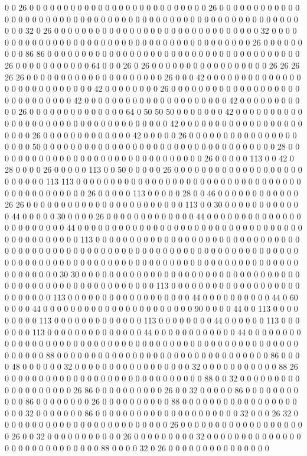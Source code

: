 0 0 26 0 0 0 0 0 0 0 0 0 0 0 0 0 0 0 0 0 0 0 0 0 0 0 0 0 0 26 0 0 0 0 0 0 0 0 0 0 0 0 0 0 0 0 0 0 0 0 0 0 0 0 0 0 0 0 0 0 0 0 0 0 0 0 0 0 0 0 0 0 0 0 0 0 0 0 0 0 0 0 0 0 0 0 0 0 32 0 26 0 0 0 0 0 0 0 0 0 0 0 0 0 0 0 0 0 0 0 0 0 0 0 0 0 0 0 0 0 0 32 0 0 0 0 0 0 0 0 0 0 0 0 0 0 0 0 0 0 0 0 0 0 0 0 0 0 0 0 0 0 0 0 0 0 0 0 0 0 0 0 26 0 0 0 0 0 0 0 0 0 86 86 0 0 0 0 0 0 0 0 0 0 0 0 0 0 0 0 0 0 0 0 0 0 0 0 0 0 0 0 0 0 0 0 0 0 0 0 0 26 0 0 0 0 0 0 0 0 0 0 0 64 0 0 0 26 0 26 0 0 0 0 0 0 0 0 0 0 0 0 0 0 0 0 0 26 26 26 26 26 0 0 0 0 0 0 0 0 0 0 0 0 0 0 0 0 0 0 0 0 26 0 0 0 42 0 0 0 0 0 0 0 0 0 0 0 0 0 0 0 0 0 0 0 0 0 0 0 0 0 0 0 42 0 0 0 0 0 0 0 0 26 0 0 0 0 0 0 0 0 0 0 0 0 0 0 0 0 0 0 0 0 0 0 0 0 0 0 0 0 0 42 0 0 0 0 0 0 0 0 0 0 0 0 0 0 0 0 0 0 0 0 0 42 0 0 0 0 0 0 0 0 0 0 0 26 0 0 0 0 0 0 0 0 0 0 0 0 0 0 64 0 50 50 50 0 0 0 0 0 0 0 42 0 0 0 0 0 0 0 0 0 0 0 0 0 0 0 0 0 0 0 0 0 0 0 0 0 0 0 0 0 0 0 0 0 0 42 0 0 0 0 0 0 0 0 0 0 0 0 0 0 0 0 0 0 0 0 0 0 26 0 0 0 0 0 0 0 0 0 0 0 0 0 42 0 0 0 0 0 26 0 0 0 0 0 0 0 0 0 0 0 0 0 0 0 0 0 0 0 0 50 0 0 0 0 0 0 0 0 0 0 0 0 0 0 0 0 0 0 0 0 0 0 0 0 0 0 0 0 0 0 0 0 0 0 28 0 0 0 0 0 0 0 0 0 0 0 0 0 0 0 0 0 0 0 0 0 0 0 0 0 0 0 0 0 0 0 26 0 0 0 0 0 113 0 0 42 0 28 0 0 0 0 26 0 0 0 0 0 113 0 0 50 0 0 0 0 0 26 0 0 0 0 0 0 0 0 0 0 0 0 0 0 0 0 0 0 0 0 0 0 0 0 0 113 113 0 0 0 0 0 0 0 0 0 0 0 0 0 0 0 0 0 0 0 0 0 0 0 0 0 0 0 0 0 0 0 0 0 0 0 0 0 0 0 0 0 0 0 0 0 26 0 0 0 0 0 113 0 0 0 0 0 28 0 0 46 0 0 0 0 0 0 0 0 0 0 0 0 26 26 0 0 0 0 0 0 0 0 0 0 0 0 0 0 0 0 0 0 0 0 0 0 0 113 0 0 30 0 0 0 0 0 0 0 0 0 0 0 0 44 0 0 0 0 0 30 0 0 0 0 26 0 0 0 0 0 0 0 0 0 0 0 0 0 44 0 0 0 0 0 0 0 0 0 0 0 0 0 0 0 0 0 0 0 0 0 0 0 44 0 0 0 0 0 0 0 0 0 0 0 0 0 0 0 0 0 0 0 0 0 0 0 0 0 0 0 0 0 0 0 0 0 0 0 0 0 0 0 0 0 0 0 0 113 0 0 0 0 0 0 0 0 0 0 0 0 0 0 0 0 0 0 0 0 0 0 0 0 0 0 0 0 0 0 0 0 0 0 0 0 0 0 0 0 0 0 0 0 0 0 0 0 0 0 0 0 0 0 0 0 0 0 0 0 0 0 0 0 0 0 0 0 0 0 0 0 0 0 0 0 0 0 0 0 0 0 0 0 0 0 0 0 0 0 0 0 0 0 0 0 0 0 0 0 0 0 0 0 0 0 0 0 0 0 0 0 0 0 0 0 0 0 0 0 0 0 0 0 30 30 0 0 0 0 0 0 0 0 0 0 0 0 0 0 0 0 0 0 0 0 0 0 0 0 0 0 0 0 0 0 0 0 0 0 0 0 0 0 0 0 0 0 0 0 0 0 0 0 0 0 0 0 0 0 113 0 0 0 0 0 0 0 0 0 0 0 0 0 0 0 0 0 0 0 0 0 0 0 0 0 0 113 0 0 0 0 0 0 0 0 0 0 0 0 0 0 0 0 0 0 44 0 0 0 0 0 0 0 0 0 0 44 0 60 0 0 0 0 44 0 0 0 0 0 0 0 0 0 0 0 0 0 0 0 0 0 0 0 0 0 0 90 0 0 0 0 44 0 0 113 0 0 0 0 0 0 0 0 0 113 0 0 0 0 0 0 0 0 0 0 0 0 0 113 0 0 0 0 0 0 0 0 44 0 0 0 0 0 0 113 0 0 0 0 0 0 0 113 0 0 0 0 0 0 0 0 0 0 0 0 0 0 44 0 0 0 0 0 0 0 0 0 0 0 0 44 0 0 0 0 0 0 0 0 0 0 0 0 0 0 0 0 0 0 0 0 0 0 0 0 0 0 0 0 0 0 0 0 0 0 0 0 0 0 0 0 0 0 0 0 0 0 0 0 0 0 0 0 0 0 0 0 0 88 0 0 0 0 0 0 0 0 0 0 0 0 0 0 0 0 0 0 0 0 0 0 0 0 0 0 0 0 0 0 0 86 0 0 0 0 48 0 0 0 0 0 0 32 0 0 0 0 0 0 0 0 0 0 0 0 0 0 0 0 0 32 0 0 0 0 0 0 0 0 0 0 0 88 26 0 0 0 0 0 0 0 0 0 0 0 0 0 0 0 0 0 0 0 0 0 0 0 0 0 0 0 0 0 88 0 0 32 0 0 0 0 0 0 0 0 0 0 0 0 0 0 0 0 0 0 0 26 86 0 0 0 0 0 0 0 0 0 0 26 0 0 32 0 0 0 0 0 86 0 0 0 0 0 0 0 0 0 0 0 86 0 0 0 0 0 0 0 0 26 0 0 0 0 0 0 0 0 0 0 88 0 0 0 0 0 0 0 0 0 0 0 0 0 0 0 0 0 0 0 0 32 0 0 0 0 0 0 0 86 0 0 0 0 0 0 0 0 0 0 0 0 0 0 0 0 0 0 0 0 0 32 0 0 0 26 32 0 0 0 0 0 0 0 0 0 0 0 0 0 0 0 0 0 0 0 0 0 0 0 0 0 26 0 0 0 0 0 0 0 0 0 0 0 0 0 0 0 0 0 0 0 26 0 0 32 0 0 0 0 0 0 0 0 0 0 0 26 0 0 0 0 0 0 0 0 0 32 0 0 0 0 0 0 0 0 0 0 0 0 0 0 0 0 0 0 0 0 0 0 0 0 0 0 0 0 88 0 0 0 0 32 0 26 0 0 0 0 0 0 0 0 0 0 0 0 0 0 0 